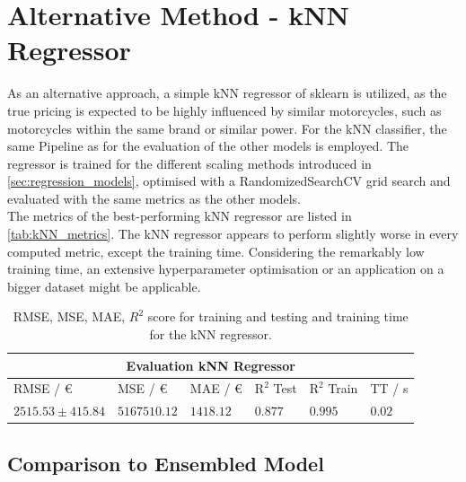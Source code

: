 \section{Alternative Method - kNN Regressor}
\label{sec:Alternative Method}

As an alternative approach, a simple kNN regressor of sklearn is utilized, as the true pricing is expected to be
highly influenced by similar motorcycles, such as motorcycles within the same brand or similar power. For the kNN classifier,
the same Pipeline as for the evaluation of the other models is employed. The regressor is trained for the different
scaling methods introduced in \autoref{sec:regression_models}, optimised with a RandomizedSearchCV grid search and 
evaluated with the same metrics as the other models.\\
The metrics of the best-performing kNN regressor are listed in \autoref{tab:kNN_metrics}. The kNN regressor
appears to perform slightly worse in every computed metric, except the training time. Considering the remarkably low
training time, an extensive hyperparameter optimisation or an application on a bigger dataset might be applicable.
\begin{table}[h!]
    \centering
    \begin{tabular}{ |p{3cm}||p{2cm}||p{2cm}|p{2cm}|p{2cm}|p{1.2cm}|  }
        \hline
        \multicolumn{6}{|c|}{Evaluation kNN Regressor} \\
        \hline
        RMSE / €  & MSE / €  & MAE / € & $ \mathrm{R}^2 $ Test& $ \mathrm{R}^2 $ Train & TT / s \\
        \hline
        $2515.53 \pm  415.84$ & $ 5167510.12$ & $1418.12$ & $0.877$ & $0.995$ & $0.02$\\
        \hline
      \end{tabular}
      \caption{RMSE, MSE, MAE, $R^2$ score for training and testing and training time for the kNN regressor.}
      \label{tab:kNN_metrics}
\end{table}

\subsection{Comparison to Ensembled Model}


